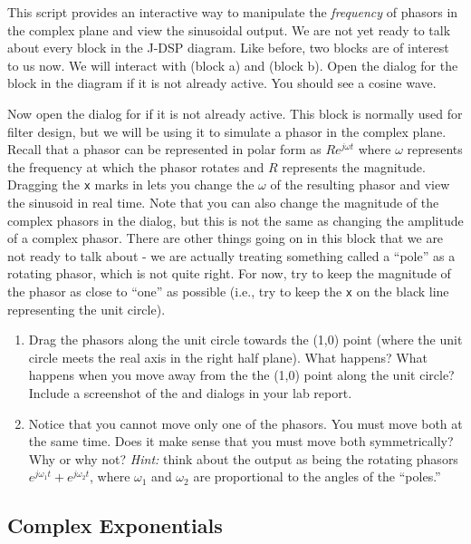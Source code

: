 This script provides an interactive way to manipulate the \textit{frequency} of phasors in the complex plane and view the sinusoidal output. We are not yet ready to talk about every block in the J-DSP diagram. Like before, two blocks are of interest to us now. We will interact with  (block a) and  (block b). Open the dialog for the  block in the diagram if it is not already active. You should see a cosine wave. 

Now open the dialog for  if it is not already active. This block is normally used for filter design, but we will be using it to simulate a phasor in the complex plane. Recall that a phasor can be represented in polar form as $Re^{j\omega t}$ where $\omega $ represents the frequency at which the phasor rotates and $R$ represents the magnitude. Dragging the \texttt{x} marks in  lets you change the $\omega $ of the resulting phasor and view the sinusoid in real time. Note that you can also change the magnitude of the complex phasors in the dialog, but this is not the same as changing the amplitude of a complex phasor. There are other things going on in this block that we are not ready to talk about - we are actually treating something called a ``pole'' as a rotating phasor, which is not quite right. For now, try to keep the magnitude of the phasor as close to ``one'' as possible (i.e., try to keep the \texttt{x} on the black line representing the unit circle). 

\begin{enumerate}
\item Drag the phasors along the unit circle towards the (1,0) point (where the unit circle meets the real axis in the right half plane). What happens? What happens when you move away from the the (1,0) point along the unit circle? Include a screenshot of the  and  dialogs in your lab report.


\item Notice that you cannot move only one of the phasors. You must move both at the same time. Does it make sense that you must move both symmetrically? Why or why not? \textit{Hint:} think about the output as being the rotating phasors $e^{j\omega_1 t}+e^{j\omega_2 t}$, where $\omega_1$ and $\omega_2 $ are proportional to the angles of the ``poles.''

\end{enumerate}


\subsection{Complex Exponentials}

